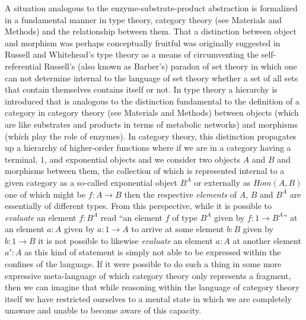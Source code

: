 A situation analogous to the enzyme-substrate-product abstraction  is formalized in a fundamental manner in type theory, category theory (see Materials and Methods) and the relationship between them. That a distinction between object and morphism was perhaps conceptually fruitful was originally suggested in Russell and Whitehead's type theory as a means of circumventing the self-referential Russell's (also known as Barber's) paradox of set theory in which one can not determine internal to the language of set theory whether a set of all sets that contain themselves contains itself or not. In type theory a hierarchy is introduced that is analogous to the distinction fundamental to the definition of a category in category theory (see Materials and Methods) between objects (which are like substrates and products in terms of metabolic networks) and morphisms (which play the role of enzymes). In category theory, this distinction propagates up a hierarchy of higher-order functions where if we are in a category having a terminal, $1$, and exponential objects and we consider two objects $A$ and $B$ and morphisms between them, the collection of which is represented internal to a given category as a so-called exponential object $B^A$ or externally as $Hom(A,B)$ one of which might be $f \colon A \rightarrow B$ then the respective \emph{elements} of $A$, $B$ and $B^A$ are essentially of different types. From this perspective, while it is possible to \emph{evaluate} an element $f:B^A$ read ``an element $f$ of type $B^A$ given by $f \colon 1 \rightarrow B^A$'' at an element $a:A$ given by $a \colon 1 \rightarrow A$ to arrive at some element $b:B$ given by $b \colon 1 \rightarrow B$ it is not possible to likewise \emph{evaluate} an element $a:A$ at another element $a':A$ as this kind of statement is simply not able to be expressed within the confines of the language. If it were possible to do such a thing in some more expressive meta-language of which category theory only represents a fragment, then we can imagine that while reasoning within the language of category theory itself we have restricted ourselves to a mental state in which we are completely unaware and unable to become aware of this capacity.

